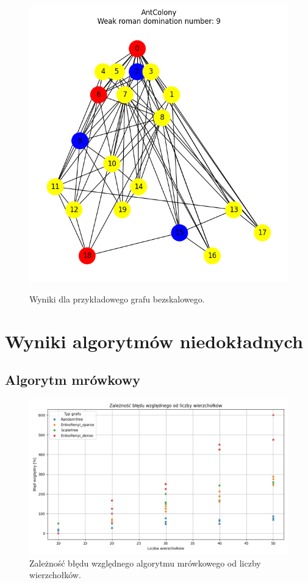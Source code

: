 \begin{figure}[htbp]
\begin{subcaptionbox}
            {\includegraphics[width=0.75\linewidth]{assets/plots/AntColony/ScaleFree_n20_i2_results.png}}
        \end{subcaptionbox}
    
        \caption{Wyniki dla przykładowego grafu bezskalowego.}
        \label{fig:tree}
    \end{figure}

\section{Wyniki algorytmów niedokładnych}

\subsection{Algorytm mrówkowy}

\begin{figure}[H]
    \centering
    \includegraphics[width=\textwidth]{assets/plots_approx/ants.png}
    \caption{Zależność błędu względnego algorytmu mrówkowego od liczby wierzchołków.}
    \label{fig:antsPlot}
\end{figure}

